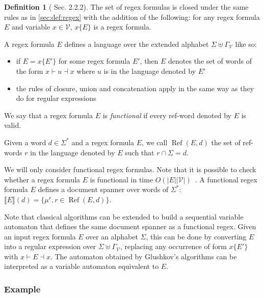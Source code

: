 \documentclass[12px]{article}
\theoremstyle{definition}
\newtheorem{definition}{Definition}
\DeclareMathOperator{\Ref}{Ref}
\begin{document}
        \begin{definition}[\cite{peterfreund} Sec. 2.2.2]
          The set of regex formulas is closed under the same rules as in
          \ref{sec:def:regex} with the addition of the following: for any regex
          formula $E$ and variable $x \in \mathcal{V}$, $x\{E\}$ is a regex
          formula.

          A regex formula $E$ defines a language over the extended alphabet
          $\Sigma \uplus \Gamma_\mathcal{V}$ like so:
            \begin{itemize}
              \item if $E = x\{E'\}$ for some regex formula $E'$, then $E$ denotes
                the set of words of the form $x{\vdash} u {\dashv}x$ where $u$ is
                in the language denoted by $E'$
              \item the rules of closure, union and concatenation apply in the same
                way as they do for regular expressions
            \end{itemize}

          We say that a regex formula $E$ is \textit{functional} if every
          ref-word denoted by $E$ is valid.

          Given a word $d \in \Sigma^*$ and a regex formula $E$, we call
          $\Ref(E, d)$ the set of ref-words $r$ in the language denoted by $E$
          such that $r \cap \Sigma = d$.
        \end{definition}

        We will only consider functional regex formulas. Note that it is
        possible to check whether a regex formula $E$ is functional in time
        $O(|E| |\mathcal{V}|)$~\cite{peterfreund}. A functional regex formula
        $E$ defines a document spanner over words of $\Sigma^*$: $\llbracket E
        \rrbracket (d) = \{\mu^r, r \in \Ref(E, d)\}$.

        Note that classical algorithms can be extended to build a sequential
        variable automaton that defines the same document spanner as a
        functional regex. Given an input regex formula $E$ over an alphabet
        $\Sigma$, this can be done by converting $E$ into a regular expression
        over $\Sigma \uplus \Gamma_\mathcal{V}$, replacing any occurrence of
        form $x\{E'\}$ with $x{\vdash} E {\dashv}x$. The automaton obtained by
        Glushkov's algorithms can be interpreted as a variable automaton
        equivalent to $E$.

      \subsubsection{Example}
\end{document}

